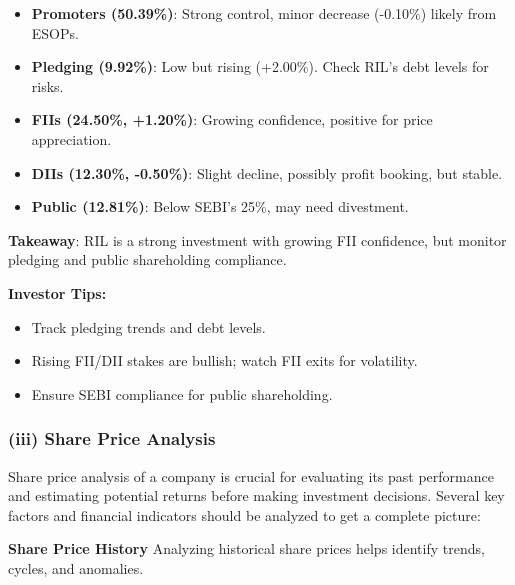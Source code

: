 \documentclass[12pt]{article}
\begin{document}
\begin{itemize}
\item \textbf{Promoters (50.39\%)}: Strong control, minor decrease (-0.10\%) likely from ESOPs.
\item \textbf{Pledging (9.92\%)}: Low but rising (+2.00\%). Check RIL's debt levels for risks.
\item \textbf{FIIs (24.50\%, +1.20\%)}: Growing confidence, positive for price appreciation.
\item \textbf{DIIs (12.30\%, -0.50\%)}: Slight decline, possibly profit booking, but stable.
\item \textbf{Public (12.81\%)}: Below SEBI's 25\%, may need divestment.
\end{itemize}

\textbf{Takeaway}: RIL is a strong investment with growing FII confidence, but monitor pledging and public shareholding compliance.

\textbf{Investor Tips:}
\begin{itemize}
\item Track pledging trends and debt levels.
\item Rising FII/DII stakes are bullish; watch FII exits for volatility.
\item Ensure SEBI compliance for public shareholding.
\end{itemize}

\subsubsection*{(iii) Share Price Analysis}

Share price analysis of a company is crucial for evaluating its past performance and estimating potential returns before making investment decisions. Several key factors and financial indicators should be analyzed to get a complete picture:

\textbf{Share Price History}
Analyzing historical share prices helps identify trends, cycles, and anomalies.
\end{document}
